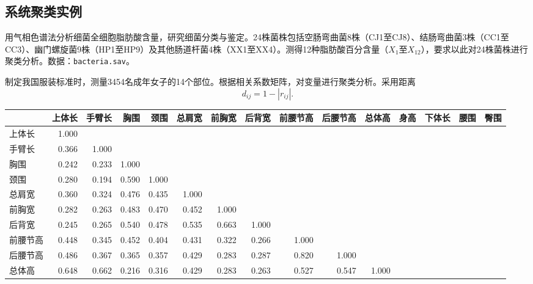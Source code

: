 \subsection{系统聚类实例}
用气相色谱法分析细菌全细胞脂肪酸含量，研究细菌分类与鉴定。24株菌株包括空肠弯曲菌8株（CJ1至CJ8）、结肠弯曲菌3株（CC1至CC3）、幽门螺旋菌9株（HP1至HP9）及其他肠道杆菌4株（XX1至XX4）。测得12种脂肪酸百分含量（$X_1$至$X_{12}$），要求以此对24株菌株进行聚类分析。数据：\texttt{bacteria.sav}。
\clearpage\begin{landscape}\thispagestyle{plain}
制定我国服装标准时，测量3454名成年女子的14个部位。根据相关系数矩阵，对变量进行聚类分析。采用距离
\[
d_{ij}=1-|r_{ij}|.
\]

\par\addvspace{5pt}\begin{center}\begin{minipage}{\linewidth}\centering
\small
{}
\begin{tabular}{lrrrrrrrrrrrrrr}\toprule
 &{\bfseries  上体长 }&{\bfseries  手臂长 }&{\bfseries  胸围 }&{\bfseries  颈围 }&{\bfseries  总肩宽 }&{\bfseries  前胸宽 }&{\bfseries  后背宽 }&{\bfseries  前腰节高 }&{\bfseries  后腰节高 }&{\bfseries  总体高 }&{\bfseries  身高 }&{\bfseries  下体长 }&{\bfseries  腰围 }&{\bfseries  臀围}\\\midrule
上体长 & 1.000 &  &  &  &  &  &  &  &  &  &  &  &  & \\
手臂长 & 0.366 & 1.000 &  &  &  &  &  &  &  &  &  &  &  & \\
胸围 & 0.242 & 0.233 & 1.000 &  &  &  &  &  &  &  &  &  &  & \\
颈围 & 0.280 & 0.194 & 0.590 & 1.000 &  &  &  &  &  &  &  &  &  & \\
总肩宽 & 0.360 & 0.324 & 0.476 & 0.435 & 1.000 &  &  &  &  &  &  &  &  & \\
前胸宽 & 0.282 & 0.263 & 0.483 & 0.470 & 0.452 & 1.000 &  &  &  &  &  &  &  & \\
后背宽 & 0.245 & 0.265 & 0.540 & 0.478 & 0.535 & 0.663 & 1.000 &  &  &  &  &  &  & \\
前腰节高 & 0.448 & 0.345 & 0.452 & 0.404 & 0.431 & 0.322 & 0.266 & 1.000 &  &  &  &  &  & \\
后腰节高 & 0.486 & 0.367 & 0.365 & 0.357 & 0.429 & 0.283 & 0.287 & 0.820 & 1.000 &  &  &  &  & \\
总体高 & 0.648 & 0.662 & 0.216 & 0.316 & 0.429 & 0.283 & 0.263 & 0.527 & 0.547 & 1.000 &  &  &  & \\

\end{tabular}
\end{minipage}
\end{center}
\end{landscape}
